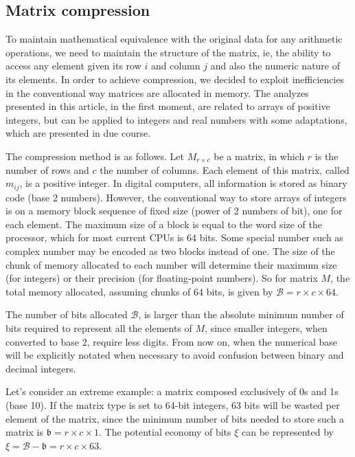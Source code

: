 \documentclass[10pt]{article}
\begin{document}
\subsection*{Matrix compression}

To maintain mathematical equivalence with the original data for any arithmetic 
operations, we need to maintain the structure of the matrix, ie, the ability 
to access any element given its row $i$ and column $j$ and also the numeric 
nature of its elements. In order to achieve compression, we decided to exploit 
inefficiencies in the conventional way matrices are allocated in memory. 
 The analyzes presented in this article, in the first 
moment, are related to arrays of positive integers, but can be applied to 
integers and real numbers with some adaptations, which are presented in due 
course. 	

The compression method is as follows. Let $M_{r \times c}$ be a matrix, in which 
$r$ is the number of rows and $c$ the number of columns. Each element of this 
matrix, called $m_{ij}$, is a positive integer. In digital computers, all 
information is stored as binary code (base 2 numbers). However, the conventional 
way to store arrays of integers is on a memory block sequence of fixed size 
(power of 2 numbers of bit), one for each element. The maximum size of a block 
is equal to the word size of the processor, which for most current CPUs is 64 
bits. Some special number such as complex number may be encoded as two blocks 
instead of one. The size of the chunk of memory allocated to each number will 
determine their maximum  size (for integers) or their precision (for 
floating-point numbers). So for matrix $M$, the total memory allocated, 
assuming chunks of 64 bits, is given by $\mathcal{B} = r \times c \times 64$.

The number of bits allocated $\mathcal{B}$, is larger than the absolute minimum 
number of bits required to represent all the elements of $M$, since smaller 
integers, when converted to base 2, require less digits. From now on, when the 
numerical base will be explicitly notated when necessary to avoid confusion 
between binary and decimal integers. 

Let's consider an extreme example: a matrix composed exclusively of 0s and 1s 
(base 10). If the matrix type is set to 64-bit integers, 63 bits will be wasted 
per element of the matrix, since the minimum number of bits needed to store such 
a matrix is $\mathfrak{b} = r \times c \times 1$. The potential economy of bits 
$\xi$ can be represented by $\xi = \mathcal{B} - \mathfrak{b} =  r \times c 
\times 63$. 
\end{document}
